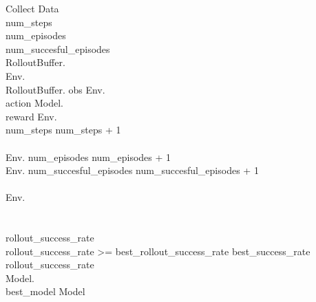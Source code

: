 \renewcommand{\thepseudonum}{\roman{pseudonum}}
\begin{pseudocode}{Collect Data}{ }
\\

num\_steps \\
num\_episodes \\
num\_succesful\_episodes \\

RolloutBuffer.\\
Env.\\
\WHILE RolloutBuffer. \DO
\BEGIN
obs \GETS Env.\\
action \GETS Model.\\
reward \GETS Env.\\
num\_steps \GETS num\_steps + 1\\
\\
\IF Env. \THEN
\BEGIN
num\_episodes \GETS num\_episodes + 1\\
\IF Env. \THEN
\BEGIN
num\_succesful\_episodes \GETS num\_succesful\_episodes + 1\\
\END\\
Env.\\
\END\\
\END\\

rollout\_success\_rate \GETS {}\\

\IF rollout\_success\_rate >= best\_rollout\_success\_rate \THEN
\BEGIN
best\_success\_rate \GETS rollout\_success\_rate\\
Model.\\
best\_model \GETS Model\\
\END\\


\ENDPROCEDURE
\label{pseudocode:collect_data}
\end{pseudocode}

